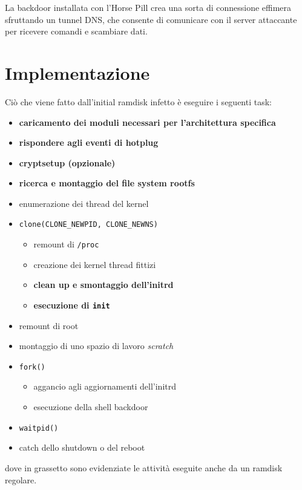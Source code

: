 \documentclass{article}
\begin{document}
La backdoor installata con l'Horse Pill crea una sorta di connessione effimera sfruttando un tunnel DNS, che consente di comunicare con il server attaccante per ricevere comandi e scambiare dati.

\newpage
\section{Implementazione}
Ciò che viene fatto dall'initial ramdisk infetto è eseguire i seguenti task:
\begin{itemize}
	\item \textbf{caricamento dei moduli necessari per l'architettura specifica}
	\item \textbf{rispondere agli eventi di hotplug}
	\item \textbf{cryptsetup (opzionale)}
	\item \textbf{ricerca e montaggio del file system rootfs}
	\item enumerazione dei thread del kernel
	\item \texttt{clone(CLONE\_NEWPID, CLONE\_NEWNS)}
	\begin{itemize}
		\item remount di \texttt{/proc}
		\item creazione dei kernel thread fittizi
		\item \textbf{clean up e smontaggio dell'initrd}
		\item \textbf{esecuzione di \texttt{init}}
	\end{itemize}
	\item remount di root
	\item montaggio di uno spazio di lavoro \textsl{scratch}
	\item \texttt{fork()}
	\begin{itemize}
		\item aggancio agli aggiornamenti dell'initrd
		\item esecuzione della shell backdoor
	\end{itemize}
	\item \texttt{waitpid()}
	\item catch dello shutdown o del reboot
\end{itemize}
dove in grassetto sono evidenziate le attività eseguite anche da un ramdisk regolare.
\end{document}
